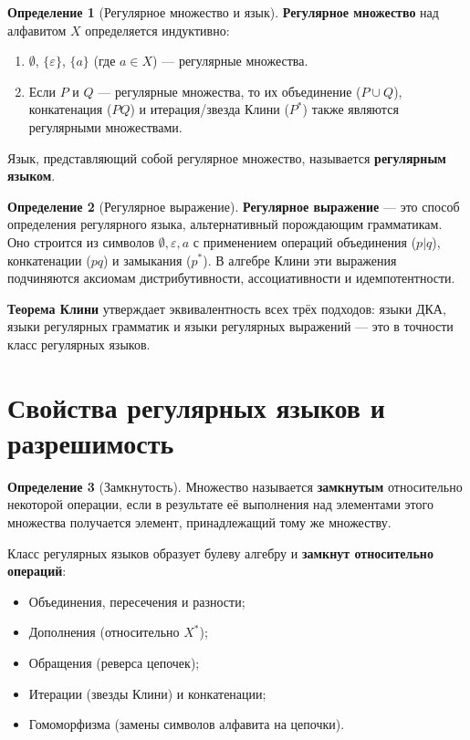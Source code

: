 \documentclass[12pt,a4paper]{article}
\theoremstyle{definition}
\newtheorem{definition}{Определение}
\theoremstyle{plain}
\theoremstyle{remark}
\begin{document}
\begin{definition}[Регулярное множество и язык]
\textbf{Регулярное множество} над алфавитом $X$ определяется индуктивно:
\begin{enumerate}
    \item $\emptyset$, $\{\varepsilon\}$, $\{a\}$ (где $a \in X$) — регулярные множества.
    \item Если $P$ и $Q$ — регулярные множества, то их объединение ($P \cup Q$), конкатенация ($PQ$) и итерация/звезда Клини ($P^*$) также являются регулярными множествами.
\end{enumerate}
Язык, представляющий собой регулярное множество, называется \textbf{регулярным языком}.
\end{definition}

\begin{definition}[Регулярное выражение]
\textbf{Регулярное выражение} — это способ определения регулярного языка, альтернативный порождающим грамматикам. Оно строится из символов $\emptyset, \varepsilon, a$ с применением операций объединения ($p|q$), конкатенации ($pq$) и замыкания ($p^*$). В алгебре Клини эти выражения подчиняются аксиомам дистрибутивности, ассоциативности и идемпотентности.
\end{definition}

\textbf{Теорема Клини} утверждает эквивалентность всех трёх подходов: языки ДКА, языки регулярных грамматик и языки регулярных выражений — это в точности класс регулярных языков.

\section{Свойства регулярных языков и разрешимость}

\begin{definition}[Замкнутость]
Множество называется \textbf{замкнутым} относительно некоторой операции, если в результате её выполнения над элементами этого множества получается элемент, принадлежащий тому же множеству.
\end{definition}

Класс регулярных языков образует булеву алгебру и \textbf{замкнут относительно операций}:
\begin{itemize}
    \item Объединения, пересечения и разности;
    \item Дополнения (относительно $X^*$);
    \item Обращения (реверса цепочек);
    \item Итерации (звезды Клини) и конкатенации;
    \item Гомоморфизма (замены символов алфавита на цепочки).
\end{itemize}
\end{document}

